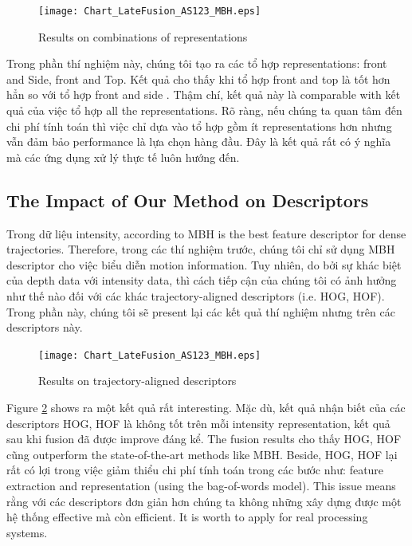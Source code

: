 \documentclass[review]{elsarticle}
\begin{document}
\begin{figure}[H]
	\begin{center}
		\texttt{[image: Chart\_LateFusion\_AS123\_MBH.eps]}
	\end{center}
	\caption{\label{lbl:Figure_CombinationsFRONTSIDETOP}Results on combinations of representations}
\end{figure}

Trong phần thí nghiệm này, chúng tôi tạo ra các tổ hợp representations: front and Side, front and Top. Kết quả cho thấy khi tổ hợp front and top là tốt hơn hẳn so với tổ hợp front and side . Thậm chí, kết quả này là comparable with kết quả của việc tổ hợp all the representations. Rõ ràng, nếu chúng ta quan tâm đến chi phí tính toán thì việc chỉ dựa vào tổ hợp gồm ít representations hơn nhưng vẫn đảm bảo performance là lựa chọn hàng đầu. Đây là kết quả rất có ý nghĩa mà các ứng dụng xử lý thực tế luôn hướng đến.

\subsection{The Impact of Our Method on Descriptors}

Trong dữ liệu intensity, according to \cite{wang2011densetraj} MBH is the best feature descriptor for dense trajectories. Therefore, trong các thí nghiệm trước, chúng tôi chỉ sử dụng MBH descriptor cho việc biểu diễn motion information. Tuy nhiên, do bởi sự khác biệt của depth data với intensity data, thì cách tiếp cận của chúng tôi có ảnh hưởng như thế nào đối với các khác trajectory-aligned descriptors (i.e. HOG, HOF). Trong phần này, chúng tôi sẽ present lại các kết quả thí nghiệm nhưng trên các descriptors này.

\begin{figure}[H]
	\begin{center}
		\texttt{[image: Chart\_LateFusion\_AS123\_MBH.eps]}
	\end{center}
	\caption{\label{lbl:Figure_MBHHOGHOF}Results on trajectory-aligned descriptors}
\end{figure}

Figure \ref{lbl:Figure_MBHHOGHOF} shows ra một kết quả rất interesting. Mặc dù, kết quả nhận biết của các descriptors HOG, HOF là không tốt trên mỗi intensity representation, kết quả sau khi fusion đã được improve đáng kể. The fusion results cho thấy HOG, HOF cũng outperform the state-of-the-art methods like MBH. Beside, HOG, HOF lại rất có lợi trong việc giảm thiểu chi phí tính toán trong các bước như: feature extraction and representation (using the bag-of-words model). This issue means rằng với các descriptors đơn giản hơn chúng ta không những xây dựng được một hệ thống effective mà còn efficient. It is worth to apply for real processing systems.
\end{document}

